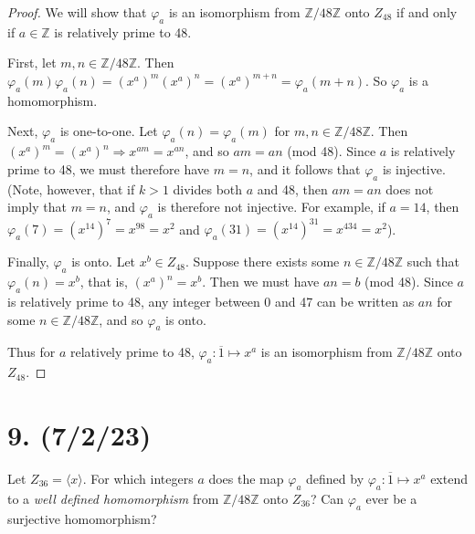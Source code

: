 \documentclass{article}
\begin{document}
\begin{proof}
    We will show that $\varphi_a$ is an isomorphism from $\mathbb{Z}/48\mathbb{Z}$ onto $Z_{48}$ if and only if $a \in \mathbb{Z}$ is relatively prime to 48.

    First, let $m, n \in \mathbb{Z}/48\mathbb{Z}$. Then $\varphi_a(m)\varphi_a(n) = (x^a)^m (x^a)^n = (x^a)^{m + n} = \varphi_a(m + n)$. So $\varphi_a$ is a homomorphism.

    Next, $\varphi_a$ is one-to-one. Let $\varphi_a(n) = \varphi_a(m)$ for $m, n \in \mathbb{Z}/48\mathbb{Z}$. Then $(x^a)^m = (x^a)^n \Rightarrow x^{am} = x^{an}$, and so $am = an$ (mod 48). Since $a$ is relatively prime to 48, we must therefore have $m = n$, and it follows that $\varphi_a$ is injective. (Note, however, that if $k > 1$ divides both $a$ and 48, then $am = an$ does not imply that $m = n$, and $\varphi_a$ is therefore not injective. For example, if $a = 14$, then $\varphi_a(7) = (x^14)^7 = x^{98} = x^2$ and $\varphi_a(31) = (x^14)^31 = x^{434} = x^2$).

    Finally, $\varphi_a$ is onto. Let $x^b \in Z_{48}$. Suppose there exists some $n \in \mathbb{Z}/48\mathbb{Z}$ such that $\varphi_a(n) = x^b$, that is, $(x^a)^n = x^b$. Then we must have $an = b$ (mod 48). Since $a$ is relatively prime to 48, any integer between 0 and 47 can be written as $an$ for some $n \in \mathbb{Z}/48\mathbb{Z}$, and so $\varphi_a$ is onto.

    Thus for $a$ relatively prime to 48, $\varphi_a: \overline{1} \mapsto x^a$ is an isomorphism from $\mathbb{Z}/48\mathbb{Z}$ onto $Z_{48}$.
\end{proof}

\section*{9. (7/2/23)}

Let $Z_{36} = \langle x \rangle$. For which integers $a$ does the map $\varphi_a$ defined by $\varphi_a: \overline{1} \mapsto x^a$ extend to a \emph{well defined homomorphism} from $\mathbb{Z}/48\mathbb{Z}$ onto $Z_{36}$? Can $\varphi_a$ ever be a surjective homomorphism?
\end{document}
